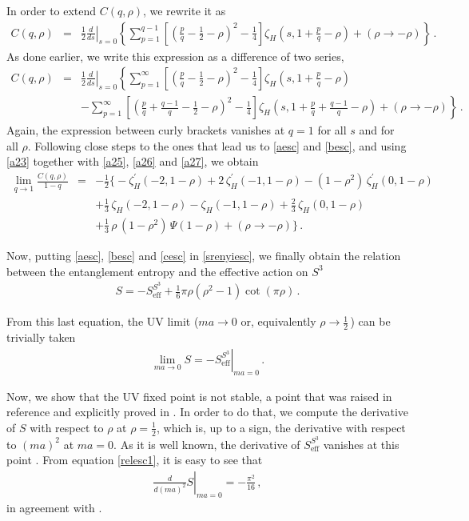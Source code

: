 \documentclass[12pt,a4paper]{article}
\newcommand{\beq}{\begin{eqnarray}}
\newcommand{\eeq}{\end{eqnarray}}
\newcommand{\nn}{\nonumber}
\numberwithin{equation}{section}
\begin{document}
In order to extend $C(q,\rho)$, we rewrite it as
\beq
C(q,\rho)&=&\left.\frac12 \frac{d}{ds}\right\vert_{s=0} \left\{\sum_{p=1}^{q-1}\left[\left(\frac{p}{q}-\frac12 -\rho \right)^2-\frac14 \right]\zeta_H\left(s, 1+\frac{p}{q}-\rho\right) +
(\rho \rightarrow -\rho)\right\}\,.\nn
\eeq
As done earlier, we write this expression as a difference of two series,
\beq
C(q,\rho)&=&\left.\frac12 \frac{d}{ds}\right\vert_{s=0} \left\{\sum_{p=1}^{\infty}\left[\left(\frac{p}{q}-\frac12 -\rho \right)^2-\frac14 \right]\zeta_H\left(s, 1+\frac{p}{q}-\rho\right) \right.\nn\\
&& - \left.\sum_{p=1}^{\infty}\left[\left(\frac{p}{q}+\frac{q-1}{q}-\frac12 -\rho \right)^2-\frac14 \right]\zeta_H\left(s, 1+\frac{p}{q}+\frac{q-1}{q}-\rho\right)+
(\rho \rightarrow -\rho)\right\}\,.\nn
\eeq
Again, the expression between curly brackets vanishes at $q=1$ for all $s$ and for all $\rho$. Following close steps to the ones that lead us to \eqref{aesc} and \eqref{besc}, and using \eqref{a23} together with \eqref{a25}, \eqref{a26} and \eqref{a27}, we obtain
\beq
\lim_{q\rightarrow 1} \frac{C(q,\rho)}{1-q} &=&-\frac12\Bigg\{-\zeta_H^{\prime}(-2,1-\rho)+2\,\zeta_H^{\prime}(-1,1-\rho)-(1-\rho^2)\,\zeta_H^{\prime}(0,1-\rho)\nn\\
&& +\frac13\,\zeta_H(-2,1-\rho)-\zeta_H(-1,1-\rho)+\frac23\,\zeta_H(0,1-\rho)\nn\\
&& +\frac13\,\rho\,(1-\rho^2)\,\Psi(1-\rho)+ (\rho \rightarrow -\rho)\Bigg\}\,.
\label{cesc}
\eeq


Now, putting \eqref{aesc}, \eqref{besc} and \eqref{cesc} in \eqref{srenyiesc}, we finally obtain the relation between the entanglement entropy and the effective action on $S^3$
\beq
S= - S_{\mathrm{eff}}^{S^3} + \frac16 \pi \rho (\rho ^2 -1) \cot(\pi \rho)\,. \label{relesc1}
\eeq

From this last equation, the UV limit ($ma \rightarrow 0$ or, equivalently $\rho \rightarrow \frac12$\,) can be trivially taken
\beq \lim_{ma \rightarrow 0} S = - \left.S_{\mathrm{eff}}^{S^3}\right\vert_{ma=0}\,.\nn\eeq

Now, we show that the UV fixed point is not stable, a point that was raised in reference \cite{klestability} and explicitly proved in \cite{dowkerrenyi}. In order to do that, we compute the derivative of $S$ with respect to $\rho$ at $\rho=\frac12$, which is, up to a sign, the derivative with respect to $(ma)^2$ at $ma=0$.
As it is well known, the derivative of $S_{\mathrm{eff}}^{S^3}$ vanishes at this point \cite{kleRenyi}. From equation \eqref{relesc1}, it is easy to see that
\beq \left.\frac{d}{d(ma)^2}S\right\vert_{ma=0}=- \frac{\pi ^2}{16}\,,\eeq
in agreement with \cite{dowkerrenyi}.
\end{document}
